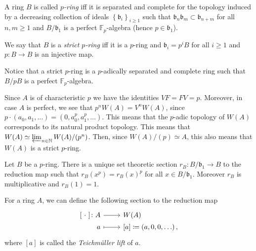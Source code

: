 \begin{defn}
	A ring $B$ is called \emph{$p$-ring} iff it is separated and complete
	for the topology induced by a decreasing collection of ideals
	$\left\{ \mathfrak{b}_i \right\}_{i \geq 1}$ such that 
	$\mathfrak{b}_n \mathfrak{b}_m \subset \mathfrak{b}_{n+m}$
	for all $n,m \geq 1$
	and $B/\mathfrak{b}_1$ is a perfect $\mathbb{F}_p$-algebra
	(hence $p \in \mathfrak{b}_1$).

	We say that $B$ is a \emph{strict $p$-ring} iff it is a $p$-ring
	and $\mathfrak{b}_i = p^iB$ for all $i \geq 1$
	and $p\colon B \to B$ is an injective map.
\end{defn}


\begin{rem}[]
	Notice that a strict $p$-ring is a $p$-adically separated and complete
	ring such that $B/pB$ is a perfect $\mathbb{F}_p$-algebra.
\end{rem}


\begin{rem}[]
	Since $A$ is of characteristic $p$ we have the identities
	$VF = FV = p$.
	Moreover, in case $A$ is perfect, we see that $p^nW(A) = V^nW(A)$,
	since $p \cdot \left( a_0, a_1, \ldots \right) =
	(0, a_0^p, a_1^p, \ldots)$.
	This means that the $p$-adic topology of $W(A)$ corresponds
	to its natural product topology.
	This means that $W(A) \simeq \varprojlim_{n \in \mathbb{N}} W(A)/ (p^n)$.
	Then, since $W(A)/ (p) \simeq A$, this also means that $W(A)$ is a strict $p$-ring.
\end{rem}


\begin{lem}\label{pRingSection}
	Let $B$ be a $p$-ring.
	There is a unique set theoretic section
	$r_B\colon B/\mathfrak{b}_1 \to B$
	to the reduction map such that
	$r_B(x^p) = r_B(x)^p$
	for all $x \in B/\mathfrak{b}_1$.
	Moreover $r_B$ is multiplicative and $r_B(1) = 1$.
\end{lem} 


\begin{defn}
	For a ring $A$, we can define the following section to the reduction map
	\begin{equation*}
	\begin{tikzcd}[row sep = 0ex
		,/tikz/column 1/.append style={anchor=base east}
		,/tikz/column 2/.append style={anchor=base west}]
		[\ \cdot \ ]\colon A \arrow[r, "", rightarrow] &
		W(A) \\
		a \arrow[r, "", mapsto] &
		[a] [a] \coloneqq \left( a, 0, 0, \ldots \right)
	,\end{tikzcd}
	\end{equation*} 
	where $[a]$ is called the \emph{Teichmüller lift} of $a$.
\end{defn}


